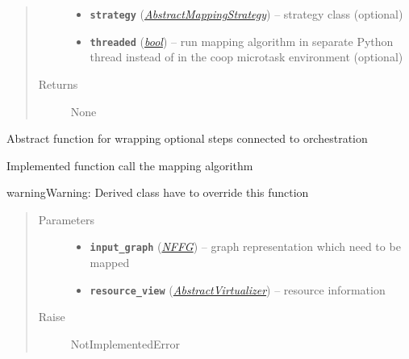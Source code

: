 \documentclass[letterpaper,10pt,english]{sphinxmanual}
\begin{document}
\begin{fulllineitems}
\begin{fulllineitems}
\begin{quote}
\begin{description}
\begin{itemize}
\item {} 
\textbf{\texttt{strategy}} ({\hyperref[util/mapping:escape.util.mapping.AbstractMappingStrategy]{\emph{\emph{AbstractMappingStrategy}}}}) -- strategy class (optional)

\item {} 
\textbf{\texttt{threaded}} (\href{https://docs.python.org/2.7/library/functions.html\#bool}{\emph{bool}}) -- run mapping algorithm in separate Python thread instead
of in the coop microtask environment (optional)

\end{itemize}

\item[{Returns}] \leavevmode
None

\end{description}\end{quote}

\end{fulllineitems}


\begin{fulllineitems}
\label{util/mapping:escape.util.mapping.AbstractMapper.orchestrate}
Abstract function for wrapping optional steps connected to orchestration

Implemented function call the mapping algorithm

\begin{notice}{warning}{Warning:}
Derived class have to override this function
\end{notice}
\begin{quote}\begin{description}
\item[{Parameters}] \leavevmode\begin{itemize}
\item {} 
\textbf{\texttt{input\_graph}} ({\hyperref[util/nffg:escape.util.nffg.NFFG]{\emph{\emph{NFFG}}}}) -- graph representation which need to be mapped

\item {} 
\textbf{\texttt{resource\_view}} ({\hyperref[orchest/virtualization_mgmt:escape.orchest.virtualization_mgmt.AbstractVirtualizer]{\emph{\emph{AbstractVirtualizer}}}}) -- resource information

\end{itemize}

\item[{Raise}] \leavevmode
NotImplementedError


\end{description}
\end{quote}
\end{fulllineitems}
\end{fulllineitems}
\end{document}
